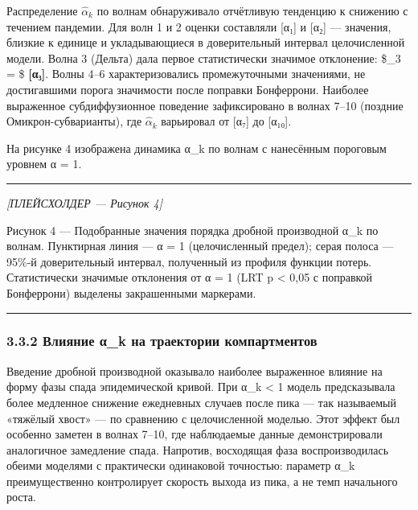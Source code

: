 \documentclass[12pt]{article}
\begin{document}
Распределение \(\hat{\alpha}_k\) по волнам обнаруживало отчётливую
тенденцию к снижению с течением пандемии. Для волн 1 и 2 оценки
составляли {[}α₁{]} и {[}α₂{]} --- значения, близкие к единице и
укладывающиеся в доверительный интервал целочисленной модели. Волна 3
(Дельта) дала первое статистически значимое отклонение:
\$\hat{\alpha}\_3 = \$ \textbf{{[}α₃{]}}. Волны 4--6 характеризовались
промежуточными значениями, не достигавшими порога значимости после
поправки Бонферрони. Наиболее выраженное субдиффузионное поведение
зафиксировано в волнах 7--10 (поздние Омикрон-субварианты), где
\(\hat{\alpha}_k\) варьировал от {[}α₇{]} до {[}α₁₀{]}.

На рисунке 4 изображена динамика α\_k по волнам с нанесённым пороговым
уровнем α = 1.

\begin{center}\rule{0.5\linewidth}{0.5pt}\end{center}

\emph{{[}ПЛЕЙСХОЛДЕР --- Рисунок 4{]}}

Рисунок 4 --- Подобранные значения порядка дробной производной α\_k по
волнам. Пунктирная линия --- α = 1 (целочисленный предел); серая полоса
--- 95\%-й доверительный интервал, полученный из профиля функции потерь.
Статистически значимые отклонения от α = 1 (LRT p \textless{} 0,05 с
поправкой Бонферрони) выделены закрашенными маркерами.

\begin{center}\rule{0.5\linewidth}{0.5pt}\end{center}

\subsubsection{3.3.2 Влияние α\_k на траектории
компартментов}\label{ux432ux43bux438ux44fux43dux438ux435-ux3b1_k-ux43dux430-ux442ux440ux430ux435ux43aux442ux43eux440ux438ux438-ux43aux43eux43cux43fux430ux440ux442ux43cux435ux43dux442ux43eux432}

Введение дробной производной оказывало наиболее выраженное влияние на
форму фазы спада эпидемической кривой. При α\_k \textless{} 1 модель
предсказывала более медленное снижение ежедневных случаев после пика ---
так называемый «тяжёлый хвост» --- по сравнению с целочисленной моделью.
Этот эффект был особенно заметен в волнах 7--10, где наблюдаемые данные
демонстрировали аналогичное замедление спада. Напротив, восходящая фаза
воспроизводилась обеими моделями с практически одинаковой точностью:
параметр α\_k преимущественно контролирует скорость выхода из пика, а не
темп начального роста.
\end{document}
